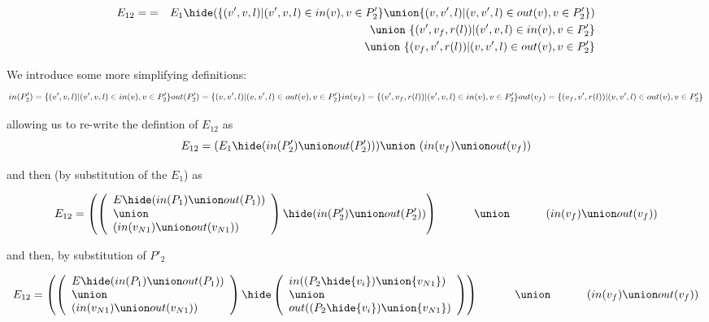 \begin{eqnarray*}
  E_{12} =  & = & E_1\hide (
                   \{(v',v,l)|(v',v,l) \in in(v), v\in P'_2\}
                   \union
                   \{(v,v',l)|(v,v',l) \in out(v), v\in P'_2\}
                  )\\
  && \union\ \{(v',v_f,r(l))|(v',v,l) \in in(v), v\in P'_2\}\\
  && \union\ \{(v_f,v',r(l))|(v,v',l) \in out(v), v\in P'_2\}\\
\end{eqnarray*}

We  introduce some more simplifying definitions:
\[
in(P'_2) = \{(v',v,l)|(v',v,l) \in in(v), v\in P'_2\}\\
out(P'_2) = \{(v,v',l)|(v,v',l) \in out(v), v\in P'_2\}\\
in(v_f) = \{(v',v_f,r(l))|(v',v,l) \in in(v), v\in P'_2\}\\
out(v_f) = \{(v_f,v',r(l))|(v,v',l) \in out(v), v\in P'_2\}\\
\]

allowing us to re-write the defintion of $E_{12}$ as
\[
  E_{12}  =  (E_1\hide ( in(P'_2) \union out(P'_2)))  \union\ (in(v_f) \union out(v_f))
\]
  

and then (by substitution of the $E_1$) as


\[
E_{12}  =  \left( \left(
\begin{array}{l}  E\hide(in(P_1) \union out(P_1)) \\  \union \\ (in(v_{N1}) \union out(v_{N1}) ) \\
\end{array} \right)
   \hide ( in(P'_2) \union out(P'_2)) \right) \\
\hphantom{E_{12}  = \;\; }   \union\ \\
\hphantom{E_{12}  = \;\;}   (in(v_f) \union out(v_f))\\ 

\]

and then, by substitution of $P'_2$

\[
E_{12}  =  \left( \left(
  \begin{array}{l}
    E\hide(in(P_1) \union out(P_1)) \\  \union \\ (in(v_{N1}) \union out(v_{N1}) ) \\
  \end{array} \right)
   \hide
   \left( \begin{array}{l}
     in((P_2\hide\{v_i\})\union\{v_{N1}\}) \\\union\\ out((P_2\hide\{v_i\})\union\{v_{N1}\})
   \end{array}
   \right) \right) \\
   \hphantom{E_{12}  = \;\; }   \union\ \\
\hphantom{E_{12}  = \;\;}   (in(v_f) \union out(v_f))\\ 
\]

